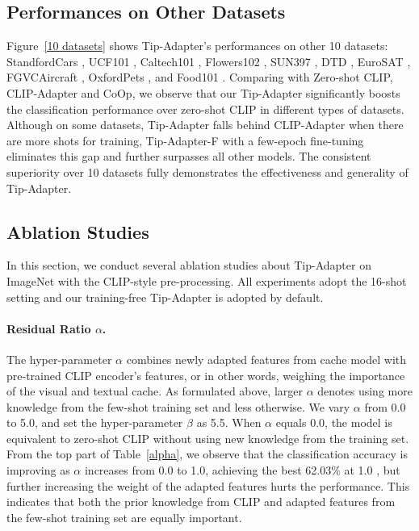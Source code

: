 \documentclass[10pt,twocolumn,letterpaper]{article}
\begin{document}
\subsection{Performances on Other Datasets}

Figure~\ref{10 datasets} shows Tip-Adapter's performances on other 10 datasets: StandfordCars \cite{krause20133d}, UCF101 \cite{soomro2012ucf101}, Caltech101 \cite{fei2004learning}, Flowers102 \cite{nilsback2008automated}, SUN397 \cite{xiao2010sun},  DTD \cite{cimpoi2014describing}, EuroSAT \cite{helber2019eurosat}, FGVCAircraft \cite{maji2013fine},  OxfordPets \cite{parkhi2012cats},  and Food101 \cite{bossard2014food}. Comparing with Zero-shot CLIP\cite{radford2021learning}, CLIP-Adapter\cite{gao2021clip} and CoOp\cite{zhou2021coop}, we observe that our Tip-Adapter significantly boosts the classification performance over zero-shot CLIP in different types of datasets. Although on some datasets, Tip-Adapter falls behind CLIP-Adapter when there are more shots for training, Tip-Adapter-F with a few-epoch fine-tuning eliminates this gap and further surpasses all other models. The consistent superiority over 10 datasets fully demonstrates the effectiveness and generality of Tip-Adapter.



\subsection{Ablation Studies}

In this section, we conduct several ablation studies about Tip-Adapter on ImageNet with the CLIP-style pre-processing. All experiments adopt the 16-shot setting and our training-free Tip-Adapter is adopted by default. 

\paragraph{Residual Ratio $\alpha$.}
The hyper-parameter $\alpha$ combines newly adapted features from cache model with pre-trained CLIP encoder's features, or in other words, weighing the importance of the visual and textual cache. As formulated above, larger $\alpha$ denotes using more knowledge from the few-shot training set and less otherwise. We vary $\alpha$ from 0.0 to 5.0, and set the hyper-parameter $\beta$ as 5.5. When $\alpha$ equals 0.0, the model is equivalent to zero-shot CLIP without using new knowledge from the training set. From the top part of Table~\ref{alpha}, we observe that the classification accuracy is improving as $\alpha$ increases from 0.0 to 1.0, achieving the best 62.03$\%$ at 1.0
, but further increasing the weight of the adapted features hurts the performance. This indicates that both the prior knowledge from CLIP and adapted features from the few-shot training set are equally important.
\end{document}
